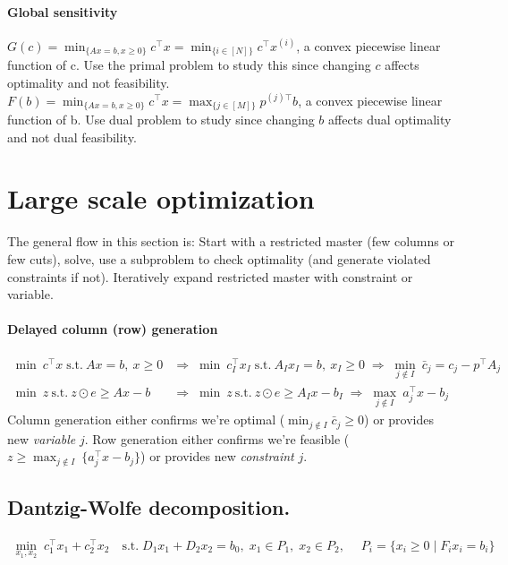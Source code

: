 \documentclass{article}
\begin{document}
\paragraph{Global sensitivity} $G(c) = \min_{\{Ax=b, x\geq 0\}}c^\top x = \min_{\{i\in[N]\}}c^\top x^{(i)}$, a convex piecewise linear function of c. Use the primal problem to study this since changing $c$ affects optimality and not feasibility. $F(b) = \min_{\{Ax=b, x\geq 0\}}c^\top x = \max_{\{j\in[M]\}}p^{(j)\top} b$, a convex piecewise linear function of b. Use dual problem to study since changing $b$ affects dual optimality and not dual feasibility.



\section{Large scale optimization}
The general flow in this section is: Start with a restricted master (few columns or few cuts), solve, use a subproblem to check optimality (and generate violated constraints if not). Iteratively expand restricted master with constraint or variable.

\paragraph{Delayed column (row) generation}
\begin{align*}
    \min\ c^\top x\; \text{s.t.}\ Ax=b,\ x\geq 0 
    &\Longrightarrow\;
    \min\ c_I^\top x_I\; \text{s.t.}\ A_Ix_I=b,\ x_I\geq 0 
    \;\Longrightarrow\;
    \min_{j\notin I}\ \bar c_j = c_j - p^\top A_j \tag{column generation}\\
    \min\ z\ \text{s.t.}\ z\odot e\geq A x - b
    &\Longrightarrow\; 
    \min\ z\ \text{s.t.}\ z\odot e\geq A_I x - b_I
    \;\Longrightarrow\;
    \max_{j\notin I}\ a_j^\top x - b_j \tag{row generation}
\end{align*}
Column generation either confirms we're optimal ($\min_{j\notin I}\bar c_j \geq 0$) or provides new \emph{variable} $j$. Row generation either confirms we're feasible ($z \geq \max_{j\notin I}\ \{a_j^\top x - b_j\}$) or provides new \emph{constraint} $j$.

\subsection{Dantzig-Wolfe decomposition.} 
\begin{align*}
    \min_{x_1,x_2}\; c_1^\top x_1 + c_2^\top x_2 \quad \text{s.t.}\; D_1x_1 + D_2x_2=b_0,\; x_1\in P_1,\; x_2\in P_2,\; \quad P_i = \{x_i\geq 0 \mid F_ix_i = b_i\}
    \tag{Too many variables, partition feasible sets into blocks, $P_i$}
\end{align*}
\end{document}
